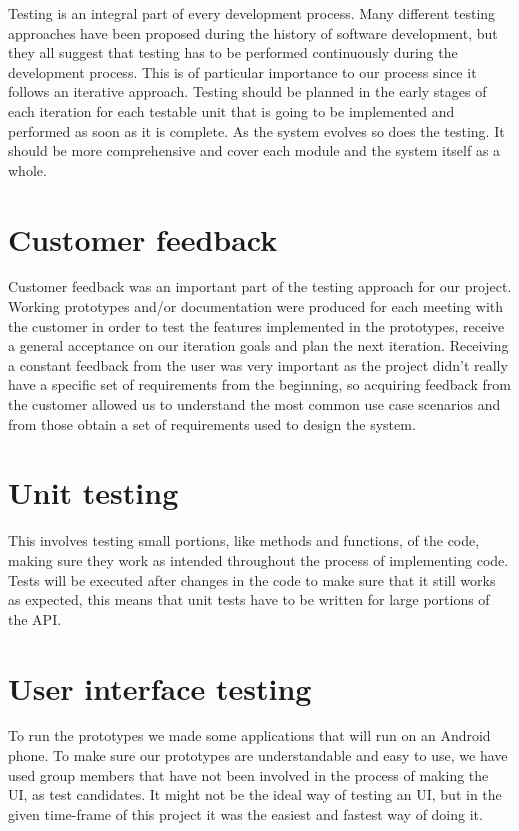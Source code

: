 
Testing is an integral part of every development process.
Many different testing approaches have been proposed during the history of
software development, but they all suggest that testing has to be performed continuously
during the development process. This is of particular importance to our process since
it follows an iterative approach. Testing should be planned in the early stages of each
iteration for each testable unit that is going to be implemented and performed as soon as
it is complete. As the system evolves so does the testing. It should be more comprehensive
and cover each module and the system itself as a whole.

\section{Customer feedback}
Customer feedback was an important part of the testing approach for our project.
Working prototypes and/or documentation were produced for each meeting with the customer
in order to test the features implemented in the prototypes, receive a general acceptance
on our iteration goals and plan the next iteration. Receiving a constant feedback from the
user was very important as the project didn't really have a specific set of requirements from
the beginning, so acquiring feedback from the customer allowed us to understand the most common
use case scenarios and from those obtain a set of requirements used to design the system.

\section{Unit testing}
This involves testing small portions, like methods and functions, of the code, making sure they work 
as intended throughout the process of implementing code. Tests will be executed after changes in the 
code to make sure that it still works as expected, this means that unit tests have to be written for 
large portions of the API.

\section{User interface testing}
To run the prototypes we made some applications that will run on an Android phone. To make sure our 
prototypes are understandable and easy to use, we have used group members that have not been 
involved in the process of making the UI, as test candidates. It might not be the ideal way of testing 
an UI, but in the given time-frame of this project it was the easiest and fastest way of doing it.

